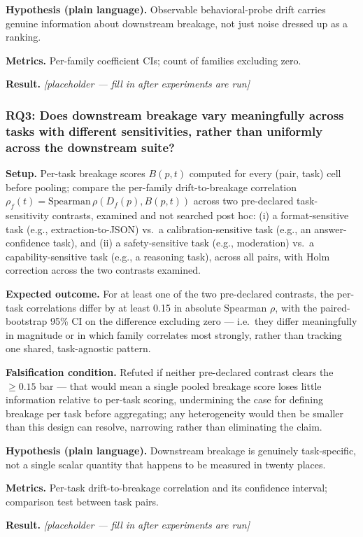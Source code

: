 \documentclass[11pt]{article}
\newcommand{\ph}{\textit{[placeholder --- fill in after experiments are run]}}
\begin{document}
\textbf{Hypothesis (plain language).} Observable behavioral-probe drift carries genuine information about downstream breakage, not just noise dressed up as a ranking.

\textbf{Metrics.} Per-family coefficient CIs; count of families excluding zero.

\textbf{Result.} \ph

\subsubsection{RQ3: Does downstream breakage vary meaningfully across tasks with different sensitivities, rather than uniformly across the downstream suite?}
\textbf{Setup.} Per-task breakage scores $B(p,t)$ computed for every (pair, task) cell before pooling; compare the per-family drift-to-breakage correlation $\rho_f(t) = \text{Spearman}\,\rho(D_f(p), B(p,t))$ across two pre-declared task-sensitivity contrasts, examined and not searched post hoc: (i) a format-sensitive task (e.g., extraction-to-JSON) vs.\ a calibration-sensitive task (e.g., an answer-confidence task), and (ii) a safety-sensitive task (e.g., moderation) vs.\ a capability-sensitive task (e.g., a reasoning task), across all pairs, with Holm correction across the two contrasts examined.

\textbf{Expected outcome.} For at least one of the two pre-declared contrasts, the per-task correlations differ by at least 0.15 in absolute Spearman $\rho$, with the paired-bootstrap 95\% CI on the difference excluding zero --- i.e.\ they differ meaningfully in magnitude or in which family correlates most strongly, rather than tracking one shared, task-agnostic pattern.

\textbf{Falsification condition.} Refuted if neither pre-declared contrast clears the $\geq 0.15$ bar --- that would mean a single pooled breakage score loses little information relative to per-task scoring, undermining the case for defining breakage per task before aggregating; any heterogeneity would then be smaller than this design can resolve, narrowing rather than eliminating the claim.

\textbf{Hypothesis (plain language).} Downstream breakage is genuinely task-specific, not a single scalar quantity that happens to be measured in twenty places.

\textbf{Metrics.} Per-task drift-to-breakage correlation and its confidence interval; comparison test between task pairs.

\textbf{Result.} \ph
\end{document}
